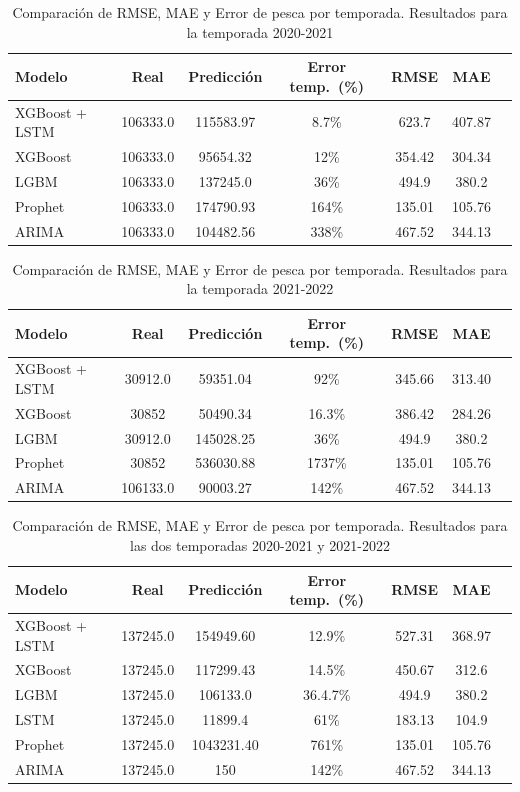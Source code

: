 \documentclass[twoside,11pt]{article}
\begin{document}
\begin{table}[htbp]
\centering
\small
\begin{tabular}{lcccccc}
\toprule
Modelo & Real & Predicción & Error temp.\ (\%) & RMSE & MAE \\
\midrule
XGBoost + LSTM & 106333.0 & 115583.97 & 8.7\% & 623.7 & 407.87 \\
XGBoost & 106333.0 & 95654.32 & 12\% & 354.42 & 304.34 \\
LGBM & 106333.0 & 137245.0 & 36\% & 494.9 & 380.2 \\
\midrule
Prophet & 106333.0 & 174790.93 & 164\% & 135.01 & 105.76 \\
ARIMA & 106333.0 & 104482.56 & 338\% & 467.52 & 344.13 \\
\bottomrule
\end{tabular}
\caption{Comparación de RMSE, MAE y Error de pesca por temporada. Resultados para la temporada 2020-2021}
\label{tab:metricas_2020_21}
\end{table}


\begin{table}[htbp]
\centering
\small
\begin{tabular}{lcccccc}
\toprule
Modelo & Real & Predicción & Error temp.\ (\%) & RMSE & MAE \\
\midrule
XGBoost + LSTM & 30912.0 & 59351.04 & 92\% & 345.66 & 313.40 \\
XGBoost & 30852 & 50490.34 & 16.3\% & 386.42 & 284.26 \\
LGBM & 30912.0 & 145028.25 & 36\% & 494.9 & 380.2 \\
\midrule
Prophet & 30852 & 536030.88 & 1737\% & 135.01 & 105.76 \\
ARIMA & 106133.0 & 90003.27 & 142\% & 467.52 & 344.13 \\
\bottomrule
\end{tabular}
\caption{Comparación de RMSE, MAE y Error de pesca por temporada. Resultados para la temporada 2021-2022}
\label{tab:metricas_2021_22}
\end{table}


\begin{table}[htbp]
\centering
\small
\begin{tabular}{lcccccc}
\toprule
Modelo & Real & Predicción & Error temp.\ (\%) & RMSE & MAE \\
\midrule
XGBoost + LSTM & 137245.0 & 154949.60 & 12.9\% & 527.31 & 368.97 \\
XGBoost & 137245.0 & 117299.43 & 14.5\% & 450.67 & 312.6 \\
LGBM & 137245.0  & 106133.0 & 36.4.7\% & 494.9 & 380.2 \\
\midrule
LSTM & 137245.0 & 11899.4 & 61\% & 183.13 & 104.9 \\
Prophet & 137245.0 & 1043231.40 & 761\% & 135.01 & 105.76 \\
ARIMA & 137245.0 & 150 & 142\% & 467.52 & 344.13 \\
\bottomrule
\end{tabular}
\caption{Comparación de RMSE, MAE y Error de pesca por temporada. Resultados para las dos temporadas 2020-2021 y 2021-2022}
\label{tab:metricas_ambas}
\end{table}
\end{document}
